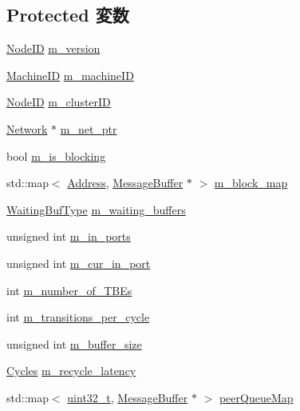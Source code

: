 \subsection*{Protected 変数}
\begin{DoxyCompactItemize}
\item 
\hyperlink{TypeDefines_8hh_a83c14b4ae37e80071f6b3506a6c46151}{NodeID} \hyperlink{classAbstractController_aa54fd03777fe9911cb24303071f918c7}{m\_\-version}
\item 
\hyperlink{structMachineID}{MachineID} \hyperlink{classAbstractController_a4d3bc5bdeb83c6982ed2341fa055ae19}{m\_\-machineID}
\item 
\hyperlink{TypeDefines_8hh_a83c14b4ae37e80071f6b3506a6c46151}{NodeID} \hyperlink{classAbstractController_a5fddc9f932bac7163c96fc4ccf27790c}{m\_\-clusterID}
\item 
\hyperlink{classNetwork}{Network} $\ast$ \hyperlink{classAbstractController_a6ffbec7c57469120487119d74fb1fae7}{m\_\-net\_\-ptr}
\item 
bool \hyperlink{classAbstractController_a0ea33ffe10dd66af8bdd7928b4d953b5}{m\_\-is\_\-blocking}
\item 
std::map$<$ \hyperlink{classAddress}{Address}, \hyperlink{classMessageBuffer}{MessageBuffer} $\ast$ $>$ \hyperlink{classAbstractController_ad9f87101fff45853a32f5fe42f9d43b0}{m\_\-block\_\-map}
\item 
\hyperlink{classAbstractController_afcfa4bb0b120bb22dce11fc367b702af}{WaitingBufType} \hyperlink{classAbstractController_a90f25dd5a7f1085002cab4e1e98f9232}{m\_\-waiting\_\-buffers}
\item 
unsigned int \hyperlink{classAbstractController_af686856d627ada54f36461fd10bc0371}{m\_\-in\_\-ports}
\item 
unsigned int \hyperlink{classAbstractController_aef85e61fde66cb7b942c755043b43520}{m\_\-cur\_\-in\_\-port}
\item 
int \hyperlink{classAbstractController_a9fe046cc3878d0da925915f0f90ab8c2}{m\_\-number\_\-of\_\-TBEs}
\item 
int \hyperlink{classAbstractController_a3fa70d035aed57776ef789fbdafa7276}{m\_\-transitions\_\-per\_\-cycle}
\item 
unsigned int \hyperlink{classAbstractController_a71fd0f20cbb3b3edc07df4aeb43b6b98}{m\_\-buffer\_\-size}
\item 
\hyperlink{classCycles}{Cycles} \hyperlink{classAbstractController_a896a9ceedfb77c22a82b490f05ae4624}{m\_\-recycle\_\-latency}
\item 
std::map$<$ \hyperlink{Type_8hh_a435d1572bf3f880d55459d9805097f62}{uint32\_\-t}, \hyperlink{classMessageBuffer}{MessageBuffer} $\ast$ $>$ \hyperlink{classAbstractController_ab2e155eabfce9e3d4b821328ecb302f9}{peerQueueMap}

\end{DoxyCompactItemize}
